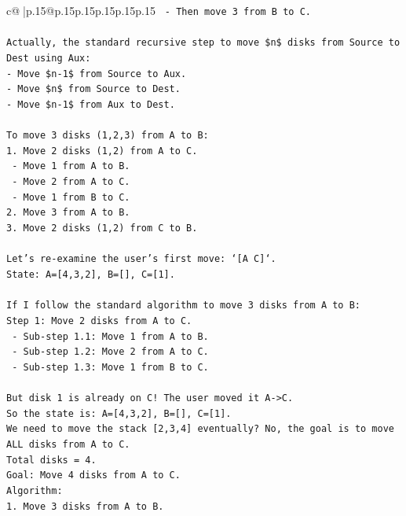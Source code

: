 \documentclass{article}
\begin{document}
{\begin{supertabular}{c@{$\;$}|p{.15\linewidth}@{}p{.15\linewidth}p{.15\linewidth}p{.15\linewidth}p{.15\linewidth}p{.15\linewidth}}
{{{\texttt{   {-} Then move 3 from B to C.} \\
\\ 
\texttt{Actually, the standard recursive step to move \$n\$ disks from Source to Dest using Aux:} \\
\texttt{{-} Move \$n{-}1\$ from Source to Aux.} \\
\texttt{{-} Move \$n\$ from Source to Dest.} \\
\texttt{{-} Move \$n{-}1\$ from Aux to Dest.} \\
\\ 
\texttt{To move 3 disks (1,2,3) from A to B:} \\
\texttt{1. Move 2 disks (1,2) from A to C.} \\
\texttt{   {-} Move 1 from A to B.} \\
\texttt{   {-} Move 2 from A to C.} \\
\texttt{   {-} Move 1 from B to C.} \\
\texttt{2. Move 3 from A to B.} \\
\texttt{3. Move 2 disks (1,2) from C to B.} \\
\\ 
\texttt{Let's re{-}examine the user's first move: `{[}A C{]}`.} \\
\texttt{State: A={[}4,3,2{]}, B={[}{]}, C={[}1{]}.} \\
\\ 
\texttt{If I follow the standard algorithm to move 3 disks from A to B:} \\
\texttt{Step 1: Move 2 disks from A to C.} \\
\texttt{   {-} Sub{-}step 1.1: Move 1 from A to B.} \\
\texttt{   {-} Sub{-}step 1.2: Move 2 from A to C.} \\
\texttt{   {-} Sub{-}step 1.3: Move 1 from B to C.} \\
\\ 
\texttt{But disk 1 is already on C! The user moved it A{-}>C.} \\
\texttt{So the state is: A={[}4,3,2{]}, B={[}{]}, C={[}1{]}.} \\
\texttt{We need to move the stack {[}2,3,4{]} eventually? No, the goal is to move ALL disks from A to C.} \\
\texttt{Total disks = 4.} \\
\texttt{Goal: Move 4 disks from A to C.} \\
\texttt{Algorithm:} \\
\texttt{1. Move 3 disks from A to B.} \\
}}}
\end{supertabular}}
\end{document}

